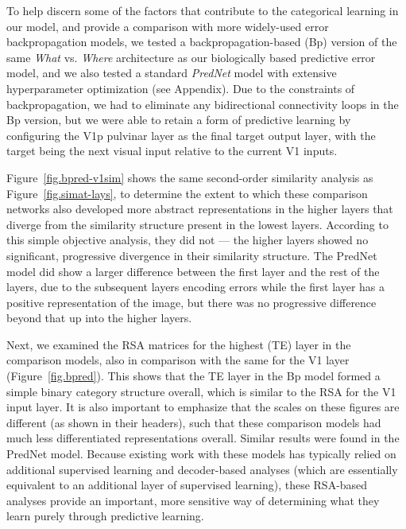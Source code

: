 \documentclass[11pt,twoside]{article}
\newif\myifpdf
\begin{document}
To help discern some of the factors that contribute to the categorical learning in our model, and provide a comparison with more widely-used error backpropagation models, we tested a backpropagation-based (Bp) version of the same \emph{What} vs. \emph{Where} architecture as our biologically based predictive error model, and we also tested a standard \emph{PredNet} model \citep{LotterKreimanCox16} with extensive hyperparameter optimization (see Appendix).  Due to the constraints of backpropagation, we had to eliminate any bidirectional connectivity loops in the Bp version, but we were able to retain a form of predictive learning by configuring the V1p pulvinar layer as the final target output layer, with the target being the next visual input relative to the current V1 inputs.

Figure~\ref{fig.bpred-v1sim} shows the same second-order similarity analysis as Figure~\ref{fig.simat-lays}, to determine the extent to which these comparison networks also developed more abstract representations in the higher layers that diverge from the similarity structure present in the lowest layers.  According to this simple objective analysis, they did not --- the higher layers showed no significant, progressive divergence in their similarity structure.  The PredNet model did show a larger difference between the first layer and the rest of the layers, due to the subsequent layers encoding errors while the first layer has a positive representation of the image, but there was no progressive difference beyond that up into the higher layers.

Next, we examined the RSA matrices for the highest (TE) layer in the comparison models, also in comparison with the same for the V1 layer (Figure~\ref{fig.bpred}).  This shows that the TE layer in the Bp model formed a simple binary category structure overall, which is similar to the RSA for the V1 input layer.  It is also important to emphasize that the scales on these figures are different (as shown in their headers), such that these comparison models had much less differentiated representations overall.  Similar results were found in the PredNet model.  Because existing work with these models has typically relied on additional supervised learning and decoder-based analyses (which are essentially equivalent to an additional layer of supervised learning), these RSA-based analyses provide an important, more sensitive way of determining what they learn purely through predictive learning.
\end{document}
